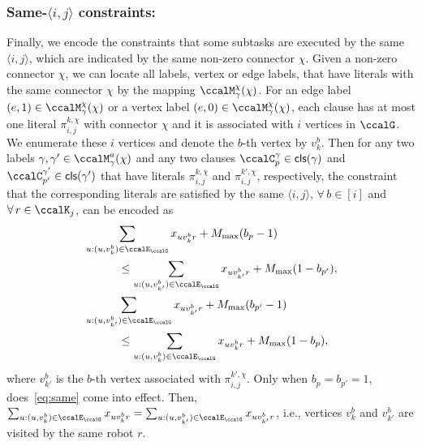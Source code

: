 \documentclass[Afour,sageh,times]{sagej}
\newcommand{\clause}[1]{\mathsf{cls}(#1)}
\newcommand{\ag}[2]{\langle#1,#2\rangle}
\newcommand{\aap}[4]{\mathcal{\pi}_{{#1},{#2}}^{#3,#4}}
\begin{document}
{{\subsubsection{Same-$\ag{i}{j}$ constraints:}\label{sec:samegroup}
Finally, we encode the constraints that some subtasks are executed by the same $\ag{i}{j}$, which are indicated by the same non-zero connector $\chi$. Given a non-zero connector $\chi$, we can locate all labels, vertex or edge labels, that have literals with the same connector $\chi$  by the mapping $\ccalM_\mathsf{\gamma}^\chi(\chi)$. For an edge label $(e, 1)  \in  \ccalM_\mathsf{\gamma}^\chi(\chi)$ or a vertex label $(e, 0)  \in  \ccalM_\mathsf{\gamma}^\chi(\chi)$, each clause has at most one literal $\aap{i}{j}{k}{\chi}$ with connector $\chi$ and it is associated with $i$ vertices in $\ccalG$. We enumerate these $i$ vertices and denote the $b$-th vertex by $v_k^b$. Then for any two labels $\gamma, \gamma'\in\ccalM_\mathsf{\gamma}^a(\chi)$ and any two clauses $\ccalC_p^\gamma \in \clause{\gamma}$ and $\ccalC_{p'}^{\gamma'} \in \clause{{\gamma'}}$ that have  literals $\aap{i}{j}{k}{\chi}$ and $\aap{i}{j}{k'}{\chi}$, respectively, {the constraint} that the corresponding literals are satisfied by the same $\ag{i}{j}$, $\forall \,b \in [i]$ and  $\forall \, r \in \ccalK_j$, can be encoded as
\begingroup\makeatletter\def\f@size{10}\check@mathfonts
\def\maketag@@@#1{\hbox{\m@th\normalsize\normalfont#1}}%
\begin{subequations}\label{eq:same}
  \begin{align}
    & \sum_{u:(u, v_k^b) \in \ccalE_\ccalG} x_{u v_k^b r} + M_{\text{max}} (b_p - 1) \nonumber \\& \quad\quad\quad \leq  \sum_{u:(u, v_{k'}^b) \in \ccalE_\ccalG} x_{u v_{k'}^b r} + M_{\text{max}}(1 - b_{p'}),\\
    & \sum_{u:(u, v_{k'}^b) \in \ccalE_\ccalG} x_{u v_{k'}^b r} + M_{\text{max}} (b_{p'} - 1) \nonumber \\& \quad\quad\quad \leq \sum_{u:(u, v_{k}^b) \in \ccalE_\ccalG} x_{u v_{k}^b r} + M_{\text{max}}(1 - b_{p}),
  \end{align}
\end{subequations}
\endgroup
where $v_{k'}^b$ is the $b$-th vertex associated with $\aap{i}{j}{k'}{\chi}$. Only when $b_p = b_{p'}=1$, does~\eqref{eq:same} come into effect. Then, $\sum\nolimits_{u:(u, v_k^b) \in \ccalE_\ccalG} x_{u v_k^b r} = \sum\nolimits_{u:(u, v_{k'}^b) \in \ccalE_\ccalG} x_{u v_{k'}^b r} $, i.e., vertices $v_k^b$ and $v_{k'}^b$ are visited by the same robot $r$.

}}
\end{document}
